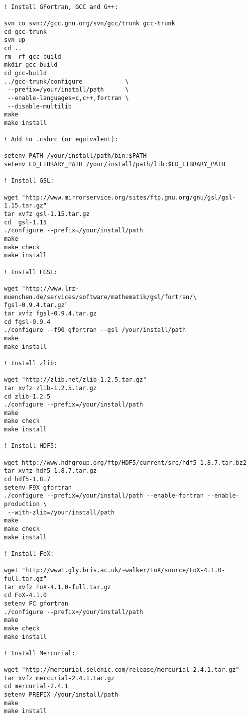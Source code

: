 \begin{lstlisting}[language=simple,stringstyle=\normalfont \ttfamily,commentstyle=\itshape]

! Install GFortran, GCC and G++:

svn co svn://gcc.gnu.org/svn/gcc/trunk gcc-trunk
cd gcc-trunk
svn up
cd ..
rm -rf gcc-build
mkdir gcc-build
cd gcc-build
../gcc-trunk/configure            \
 --prefix=/your/install/path      \
 --enable-languages=c,c++,fortran \
 --disable-multilib
make
make install

! Add to .cshrc (or equivalent):

setenv PATH /your/install/path/bin:$PATH                                                                                           
setenv LD_LIBRARY_PATH /your/install/path/lib:$LD_LIBRARY_PATH

! Install GSL:

wget "http://www.mirrorservice.org/sites/ftp.gnu.org/gnu/gsl/gsl-1.15.tar.gz"
tar xvfz gsl-1.15.tar.gz
cd  gsl-1.15
./configure --prefix=/your/install/path
make
make check
make install

! Install FGSL:

wget "http://www.lrz-muenchen.de/services/software/mathematik/gsl/fortran/\
fgsl-0.9.4.tar.gz"
tar xvfz fgsl-0.9.4.tar.gz
cd fgsl-0.9.4
./configure --f90 gfortran --gsl /your/install/path
make
make install

! Install zlib:

wget "http://zlib.net/zlib-1.2.5.tar.gz"
tar xvfz zlib-1.2.5.tar.gz
cd zlib-1.2.5
./configure --prefix=/your/install/path
make
make check
make install

! Install HDF5:

wget http://www.hdfgroup.org/ftp/HDF5/current/src/hdf5-1.8.7.tar.bz2
tar xvfz hdf5-1.8.7.tar.gz
cd hdf5-1.8.7
setenv F9X gfortran
./configure --prefix=/your/install/path --enable-fortran --enable-production \
 --with-zlib=/your/install/path
make
make check
make install

! Install FoX:

wget "http://www1.gly.bris.ac.uk/~walker/FoX/source/FoX-4.1.0-full.tar.gz"
tar xvfz FoX-4.1.0-full.tar.gz
cd FoX-4.1.0
setenv FC gfortran
./configure --prefix=/your/install/path
make
make check
make install

! Install Mercurial:

wget "http://mercurial.selenic.com/release/mercurial-2.4.1.tar.gz"
tar xvfz mercurial-2.4.1.tar.gz
cd mercurial-2.4.1
setenv PREFIX /your/install/path
make
make install


\end{lstlisting}
